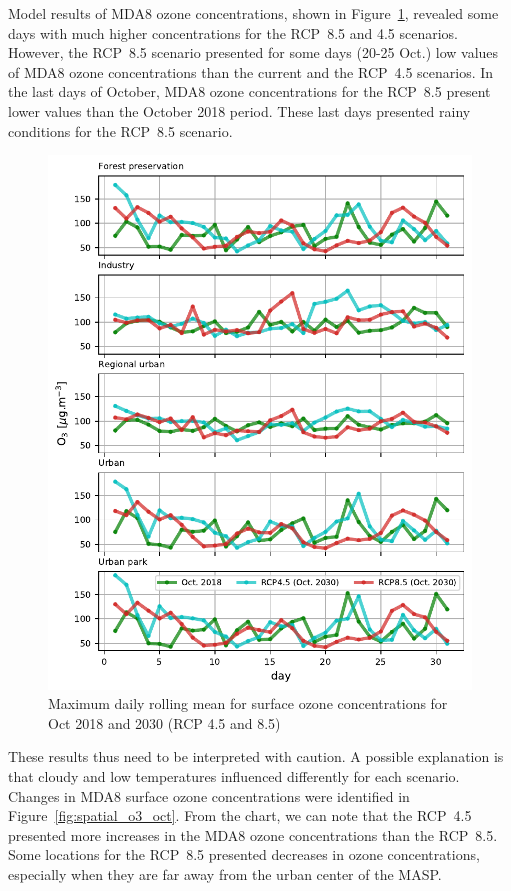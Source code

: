 Model results of MDA8 ozone concentrations, shown in Figure~\ref{fig:MDA8_rcp_oct}, revealed some days with much higher concentrations for the RCP~8.5 and 4.5 scenarios.
However, the RCP~8.5 scenario presented for some days (20-25 Oct.) low values of MDA8 ozone concentrations than the current and the RCP~4.5 scenarios.
In the last days of October, MDA8 ozone concentrations for the RCP~8.5 present lower values than the October 2018 period.
These last days presented rainy conditions for the RCP~8.5 scenario. 

\begin{figure}[!hbt]
  \begin{center}
	\includegraphics{fig/MDA8_type_rcps_oct18}
  \end{center}
  \caption{Maximum daily rolling mean for surface ozone concentrations for Oct 2018 and 2030 (RCP 4.5 and 8.5)}
  \label{fig:MDA8_rcp_oct}
\end{figure}

These results thus need to be interpreted with caution.
A possible explanation is that cloudy and low temperatures influenced differently for each scenario.
Changes in MDA8 surface ozone concentrations were identified in Figure~\ref{fig:spatial_o3_oct}. 
From the chart, we can note that the RCP~4.5 presented more increases in the MDA8 ozone concentrations than the RCP~8.5.
Some locations for the RCP~8.5 presented decreases in ozone concentrations, especially when they are far away from the urban center of the MASP.

